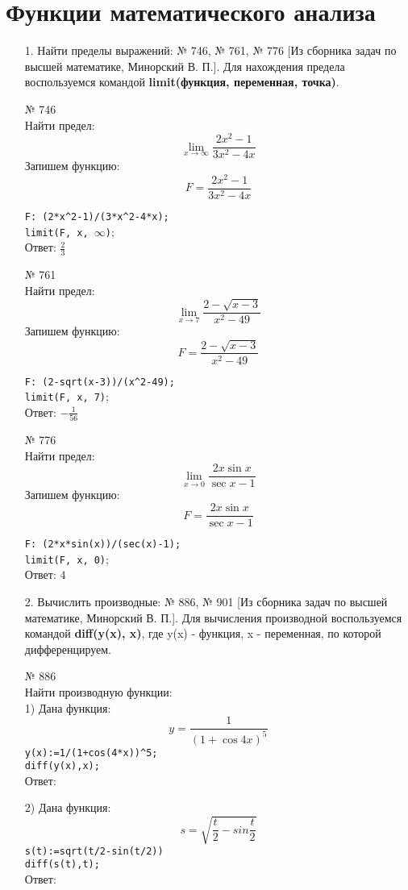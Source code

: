 \documentclass[article, bachelor, och, pract]{SCWorks}
\begin{document}
\section{Функции математического анализа}
\begin{itemize}
\item[1.] Найти пределы выражений: № 746, № 761, № 776 [Из сборника задач по высшей математике, Минорский В. П.]. Для нахождения предела воспользуемся командой \textbf{limit(функция, переменная, точка)}.

№ 746\\
Найти предел:
$$\lim_{x \to \infty}\frac{2x^2-1}{3x^2-4x}$$
Запишем функцию:
$$F=\frac{2x^2-1}{3x^2-4x}$$

\texttt{F: (2*x\^{}2-1)/(3*x\^{}2-4*x);}\\
\texttt{limit(F, x, $\infty$)}; \\ 
Ответ: $\frac{2}{3}$

№ 761\\
Найти предел:
$$\lim_{x \to 7}\frac{2-\sqrt{x-3}}{x^2-49}$$
Запишем функцию:
$$F=\frac{2-\sqrt{x-3}}{x^2-49}$$

\texttt{F: (2-sqrt(x-3))/(x\^{}2-49);}\\
\texttt{limit(F, x, 7)}; \\ 
Ответ: $-\frac{1}{56}$

№ 776\\
Найти предел:
$$\lim_{x \to 0}\frac{2x\sin{x}}{\sec{x}-1}$$
Запишем функцию:
$$F=\frac{2x\sin{x}}{\sec{x}-1}$$

\texttt{F: (2*x*sin(x))/(sec(x)-1);}\\
\texttt{limit(F, x, 0)}; \\ 
Ответ: $4$

\item[2.] Вычислить производные: № 886, № 901 [Из сборника задач по высшей математике, Минорский В. П.]. Для вычисления производной воспользуемся командой \textbf{diff(y(x), x)}, где y(x) - функция, x - переменная, по которой дифференцируем.

№ 886\\
Найти производную функции:\\
1) Дана функция: $$ y = \frac{1}{(1+\cos{4x})^5} $$
\texttt{y(x):=1/(1+cos(4*x))\^{}5;}\\
\texttt{diff(y(x),x);}\\
Ответ:


2) Дана функция: $$ s = \sqrt{\frac{t}{2} - sin{\frac{t}{2}}} $$
\texttt{s(t):=sqrt(t/2-sin(t/2))}\\
\texttt{diff(s(t),t);}\\
Ответ:


\end{itemize}
\end{document}
